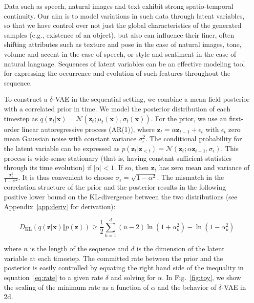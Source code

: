 \documentclass{article} \usepackage{iclr2019_conference,times}
\def\figref#1{figure~\ref{#1}}
\def\eqref#1{equation~\ref{#1}}
\def\rvx{{\mathbf{x}}}
\def\rvz{{\mathbf{z}}}
\newcommand{\KL}{D_{\mathrm{KL}}}
\renewcommand{\figref}[1]{Fig.~\ref{#1}}
\newcommand{\aref}[1]{Appendix~\ref{#1}}
\begin{document}
Data such as speech, natural images and text exhibit strong spatio-temporal continuity. Our aim is to model variations in such data through latent variables, so that we have control over not just the global
characteristics of the generated samples (e.g., existence of an object), but also can influence their finer, often shifting attributes such as texture and pose in the case of natural images, tone, volume and accent in the case of speech, or style and sentiment in the case of natural language. Sequences of latent variables can be an effective modeling tool for expressing the occurrence and evolution of such features throughout the sequence. 

\par
To construct a $\delta$-VAE in the sequential setting, we combine a mean field posterior with a correlated prior in time. We model the posterior distribution of each timestep as $q(\rvz_t|\rvx) = \mathcal{N}(\rvz_t; \mu_t(\rvx), \sigma_t(\rvx))$. For the prior, we use an first-order linear autoregressive process (AR(1)), where $\rvz_t = \alpha\rvz_{t-1} + \epsilon_t$ with $\epsilon_t$ zero mean Gaussian noise with constant variance $\sigma_\epsilon ^ 2$. The conditional probability for the latent variable can be expressed as $p(\rvz_t|\rvz_{<t}) = \mathcal{N}(\rvz_t; \alpha\rvz_{t-1}, \sigma_\epsilon)$. This process is wide-sense stationary (that is, having constant sufficient statistics through its time evolution) if $|\alpha| < 1$. If so, then $\rvz_t$ has zero mean and variance of $\frac{\sigma_\epsilon^2}{1 - \alpha^2}$. It is thus convenient to choose $\sigma_\epsilon = \sqrt{1 - \alpha^2}$.  The mismatch in the correlation structure of the prior and the posterior results in the following positive lower bound on the KL-divergence between the two distributions (see \aref{app:deriv} for derivation):

\begin{equation}\label{eq:rate}
    \KL(q(\rvz|\rvx) \Vert p(\rvz)) \geq \frac{1}{2}\sum_{k=1}^{d} (n-2)\ln(1 + \alpha_k^2) - \ln(1-\alpha_k^2)
\end{equation}

where $n$ is the length of the sequence and $d$ is the dimension of the latent variable at each timestep. The committed rate between the prior and the posterior is easily controlled by equating the right hand side of the inequality in \eqref{eq:rate} to a given rate $\delta$ and solving for $\alpha$. In  \figref{fig:toy}, we show the scaling of the minimum rate as a function of $\alpha$ and the behavior of $\delta$-VAE in 2d.
\end{document}

